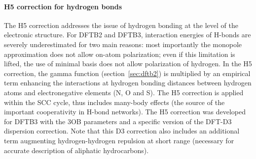 \documentclass{revtex4-1}
\begin{document}
\paragraph{H5 correction for hydrogen bonds}

The H5 correction\cite{rezac2017} addresses the issue of hydrogen bonding at
the level of the electronic structure.  For DFTB2 and DFTB3, interaction
energies of H-bonds are severely underestimated for two main reasons: most
importantly the monopole approximation does not allow on-atom polarization; even
if this limitation is lifted, the use of minimal basis does not allow
polarization of hydrogen.  In the H5 correction, the gamma function
(section~\ref{sec:dftb2}) is multiplied by an empirical term enhancing the
interactions at hydrogen bonding distances between hydrogen atoms and
electronegative elements (N, O and S). The H5 correction is applied within the
SCC cycle, thus includes many-body effects (the source of the important
cooperativity in H-bond networks).
The H5 correction was developed for DFTB3 with the 3OB parameters and a specific
version of the DFT-D3\cite{grimme2010,grimme2011} dispersion correction. Note
that this D3 correction also includes an additional term augmenting
hydrogen-hydrogen repulsion at short range (necessary for accurate description
of aliphatic hydrocarbons\cite{rezac_2012,vorlova_2015}).
\end{document}
